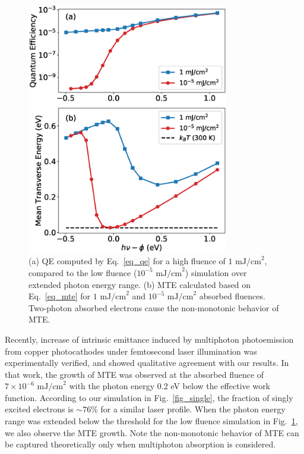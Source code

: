 \begin{figure}
	\centering
	\includegraphics*[width=250pt]{figs/boltzmann/high.eps}
	\caption{(a) QE computed by Eq.~\ref{eq_qe} for a high fluence of $1 \textrm{ mJ/cm}^2$, compared to the low fluence ($10^{-5} \textrm{ mJ/cm}^2$) simulation over extended photon energy range. (b) MTE calculated based on Eq.~\ref{eq_mte} for $1 \textrm{ mJ/cm}^2$ and $10^{-5} \textrm{ mJ/cm}^2$ absorbed fluences. Two-photon absorbed electrons cause the non-monotonic behavior of MTE.}
	\label{fig_high}
\end{figure}


Recently, increase of intrinsic emittance induced by multiphoton photoemission from copper photocathodes under femtosecond laser illumination was experimentally verified,\cite{An2018} and showed qualitative agreement with our results. In that work, the growth of MTE was observed at the absorbed fluence of $7 \times 10^{-6} \textrm{ mJ/cm}^2$ with the photon energy 0.2 eV below the effective work function. According to our simulation in Fig.~\ref{fig_single}, the fraction of singly excited electrons is $\sim 76 \%$ for a similar laser profile.
When the photon energy range was extended below the threshold for the low fluence simulation in Fig.~\ref{fig_high}, we also observe the MTE growth.
Note the non-monotonic behavior of MTE can be captured theoretically only when multiphoton absorption is considered.



